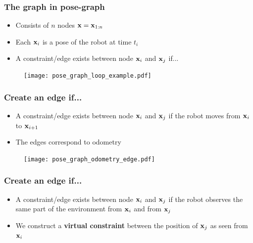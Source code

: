    \begin{frame}
    \frametitle{The graph in pose-graph}
   
    \begin{itemize}
    \item Consists of $n$ nodes $\boldsymbol{\mathbf{x}} = \boldsymbol{\mathbf{x}}_{1:n}$
    \item Each $\boldsymbol{\mathbf{x}}_{i}$ is a pose of the robot at time $t_{i}$
    \item A constraint/edge exists between node $\boldsymbol{\mathbf{x}}_{i}$ and $\boldsymbol{\mathbf{x}}_{j}$ if...
   \end{itemize}
   
   \begin{figure}[!h]
   \texttt{[image: pose\_graph\_loop\_example.pdf]}
   \end{figure}
   
   \end{frame}
   
   \begin{frame}
   \frametitle{Create an edge if...}
   
   \begin{itemize}
   \item A constraint/edge exists between node $\boldsymbol{\mathbf{x}}_{i}$ and $\boldsymbol{\mathbf{x}}_{j}$ if the robot moves from $\boldsymbol{\mathbf{x}}_{i}$ to $\boldsymbol{\mathbf{x}}_{i+1}$
   \item The edges correspond to odometry
   \end{itemize}
   
   \begin{figure}[!h]
   \texttt{[image: pose\_graph\_odometry\_edge.pdf]}
   \end{figure}
   
   \end{frame}
   
   \begin{frame}
   \frametitle{Create an edge if...}
   
   \begin{itemize}
   \item<1-> A constraint/edge exists between node $\boldsymbol{\mathbf{x}}_{i}$ and $\boldsymbol{\mathbf{x}}_{j}$ if the robot observes the same part of the environment from $\boldsymbol{\mathbf{x}}_{i}$ and from $\boldsymbol{\mathbf{x}}_{j}$
   \item<2> We construct a {\bf virtual constraint} between the position of $\boldsymbol{\mathbf{x}}_{j}$ as seen from $\boldsymbol{\mathbf{x}}_{i}$
   \end{itemize}
   
   \end{frame}
   

